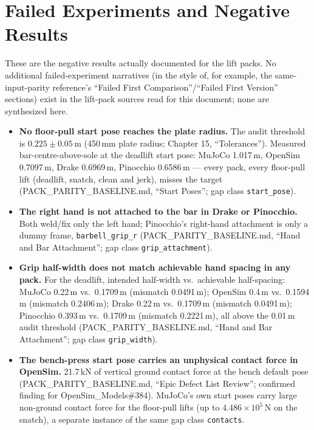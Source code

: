 \documentclass[11pt,a4paper]{article}
\begin{document}
\section{Failed Experiments and Negative Results}\label{sec:failed}
These are the negative results actually documented for the lift packs. No
additional failed-experiment narratives (in the style of, for example, the
same-input-parity reference's ``Failed First Comparison''/``Failed First
Version'' sections) exist in the lift-pack sources read for this document;
none are synthesized here.

\begin{itemize}[nosep]
\item \textbf{No floor-pull start pose reaches the plate radius.} The audit
  threshold is $0.225\pm0.05$\,m (450\,mm plate radius; Chapter 15,
  ``Tolerances''). Measured bar-centre-above-sole at the deadlift start pose:
  MuJoCo 1.017\,m, OpenSim 0.7097\,m, Drake 0.6969\,m, Pinocchio 0.6586\,m ---
  every pack, every floor-pull lift (deadlift, snatch, clean and jerk), misses
  the target (PACK\_PARITY\_BASELINE.md, ``Start Poses''; gap class
  \texttt{start\_pose}).
\item \textbf{The right hand is not attached to the bar in Drake or
  Pinocchio.} Both weld/fix only the left hand; Pinocchio's right-hand
  attachment is only a dummy frame, \texttt{barbell\_grip\_r}
  (PACK\_PARITY\_BASELINE.md, ``Hand and Bar Attachment''; gap class
  \texttt{grip\_attachment}).
\item \textbf{Grip half-width does not match achievable hand spacing in any
  pack.} For the deadlift, intended half-width vs.\ achievable half-spacing:
  MuJoCo 0.22\,m vs.\ 0.1709\,m (mismatch 0.0491\,m); OpenSim 0.4\,m vs.\
  0.1594\,m (mismatch 0.2406\,m); Drake 0.22\,m vs.\ 0.1709\,m (mismatch
  0.0491\,m); Pinocchio 0.393\,m vs.\ 0.1709\,m (mismatch 0.2221\,m), all
  above the 0.01\,m audit threshold (PACK\_PARITY\_BASELINE.md, ``Hand and Bar
  Attachment''; gap class \texttt{grip\_width}).
\item \textbf{The bench-press start pose carries an unphysical contact
  force in OpenSim.} 21.7\,kN of vertical ground contact force at the bench
  default pose (PACK\_PARITY\_BASELINE.md, ``Epic Defect List Review'';
  confirmed finding for OpenSim\_Models\#384). MuJoCo's own start poses carry
  large non-ground contact force for the floor-pull lifts (up to
  $4.486\times10^{5}$\,N on the snatch), a separate instance of the same gap
  class \texttt{contacts}.
\end{itemize}
\end{document}
